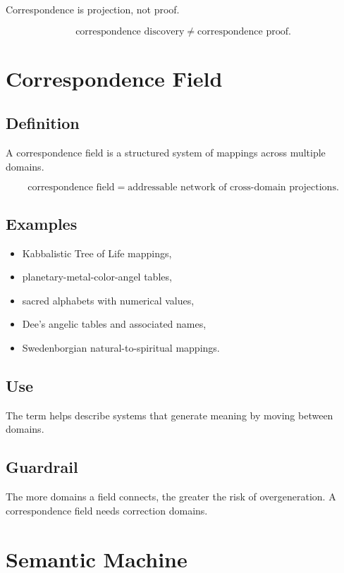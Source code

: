 \documentclass[11pt]{book}
\begin{document}
Correspondence is projection, not proof.

\[
\text{correspondence discovery} \neq \text{correspondence proof}.
\]

\section{Correspondence Field}

\subsection*{Definition}

A correspondence field is a structured system of mappings across multiple domains.

\[
\text{correspondence field} = \text{addressable network of cross-domain projections}.
\]

\subsection*{Examples}

\begin{itemize}
    \item Kabbalistic Tree of Life mappings,
    \item planetary-metal-color-angel tables,
    \item sacred alphabets with numerical values,
    \item Dee's angelic tables and associated names,
    \item Swedenborgian natural-to-spiritual mappings.
\end{itemize}

\subsection*{Use}

The term helps describe systems that generate meaning by moving between domains.

\subsection*{Guardrail}

The more domains a field connects, the greater the risk of overgeneration. A correspondence field needs correction domains.

\section{Semantic Machine}
\end{document}
